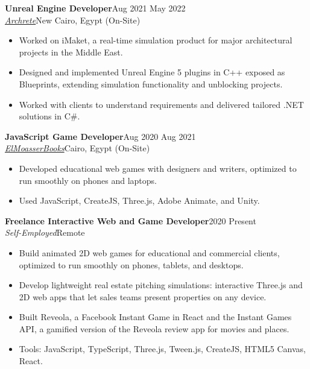 \documentclass[10pt,a4paper]{article}
\newcommand{\job}[4]{%
  \vspace{4pt}\textbf{#1}\hfill #4\\
  \textit{#2}\hfill #3\par\vspace{1pt}}
\begin{document}
\job{Unreal Engine Developer}{\href{https://archrete.com/}{Archrete}}{New Cairo, Egypt (On-Site)}{Aug 2021 \textendash{} May 2022}
\begin{itemize}
  \item Worked on iMaket, a real-time simulation product for major architectural projects in the Middle East.
  \item Designed and implemented Unreal Engine 5 plugins in C++ exposed as Blueprints, extending simulation
        functionality and unblocking projects.
  \item Worked with clients to understand requirements and delivered tailored .NET solutions in C\#.
\end{itemize}

\job{JavaScript Game Developer}{\href{https://www.gpseducation.com/}{ElMoasserBooks}}{Cairo, Egypt (On-Site)}{Aug 2020 \textendash{} Aug 2021}
\begin{itemize}
  \item Developed educational web games with designers and writers, optimized to run smoothly on phones and laptops.
  \item Used JavaScript, CreateJS, Three.js, Adobe Animate, and Unity.
\end{itemize}

\job{Freelance Interactive Web and Game Developer}{Self-Employed}{Remote}{2020 \textendash{} Present}
\begin{itemize}
  \item Build animated 2D web games for educational and commercial clients, optimized to run smoothly on phones,
        tablets, and desktops.
  \item Develop lightweight real estate pitching simulations: interactive Three.js and 2D web apps that let sales teams
        present properties on any device.
  \item Built Reveola, a Facebook Instant Game in React and the Instant Games API, a gamified version of the Reveola
        review app for movies and places.
  \item Tools: JavaScript, TypeScript, Three.js, Tween.js, CreateJS, HTML5 Canvas, React.
\end{itemize}

\end{document}
